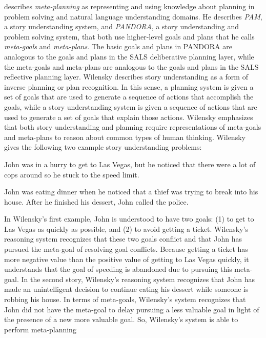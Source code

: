 \cite{wilensky:1981} describes {\emph{meta-planning}} as representing
and using knowledge about planning in problem solving and natural
language understanding domains.  He describes {\emph{PAM}}, a story
understanding system, and {\emph{PANDORA}}, a story understanding and
problem solving system, that both use higher-level goals and plans
that he calls {\emph{meta-goals}} and {\emph{meta-plans}}.  The basic
goals and plans in PANDORA are analogous to the goals and plans in the
SALS deliberative planning layer, while the meta-goals and meta-plans
are analogous to the goals and plans in the SALS reflective planning
layer.  Wilensky describes story understanding as a form of inverse
planning or plan recognition.  In this sense, a planning system is
given a set of goals that are used to generate a sequence of actions
that accomplish the goals, while a story understanding system is given
a sequence of actions that are used to generate a set of goals that
explain those actions.  Wilensky emphasizes that both story
understanding and planning require representations of meta-goals and
meta-plans to reason about common types of human thinking.  Wilensky
gives the following two example story understanding problems:
\begin{packed_enumerate}
\item{John was in a hurry to get to Las Vegas, but he noticed that
  there were a lot of cops around so he stuck to the speed limit.}
\item{John was eating dinner when he noticed that a thief was trying
  to break into his house.  After he finished his dessert, John called
  the police.}
\end{packed_enumerate}
In Wilensky's first example, John is understood to have two goals: (1)
to get to Las Vegas as quickly as possible, and (2) to avoid getting a
ticket.  Wilensky's reasoning system recognizes that these two goals
conflict and that John has pursued the meta-goal of resolving goal
conflicts.  Because getting a ticket has more negative value than the
positive value of getting to Las Vegas quickly, it understands that
the goal of speeding is abandoned due to pursuing this meta-goal.  In
the second story, Wilensky's reasoning system recognizes that John has
made an unintelligent decision to continue eating his dessert while
someone is robbing his house.  In terms of meta-goals, Wilensky's
system recognizes that John did not have the meta-goal to delay
pursuing a less valuable goal in light of the presence of a new more
valuable goal.  So, Wilensky's system is able to perform meta-planning
